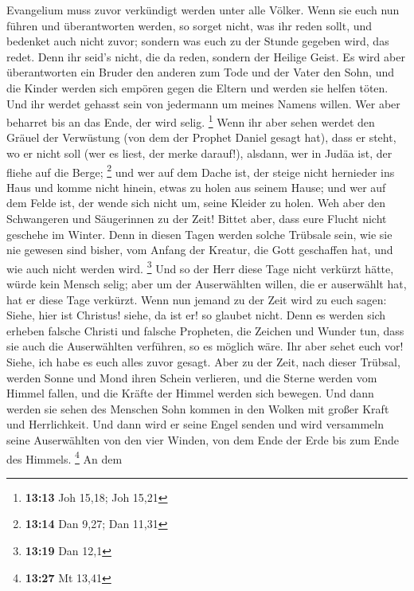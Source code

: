 Evangelium muss zuvor verkündigt werden unter alle Völker. 
Wenn sie euch nun führen und überantworten werden, so sorget nicht, was
ihr reden sollt, und bedenket auch nicht zuvor; sondern was euch zu der
Stunde gegeben wird, das redet. Denn ihr seid's nicht, die da reden,
sondern der Heilige Geist.  Es wird aber überantworten ein
Bruder den anderen zum Tode und der Vater den Sohn, und die Kinder
werden sich empören gegen die Eltern und werden sie helfen töten.
 Und ihr werdet gehasst sein von jedermann um meines Namens
willen. Wer aber beharret bis an das Ende, der wird selig. \footnote{\textbf{13:13}
  Joh 15,18; Joh 15,21}  Wenn ihr aber sehen werdet den
Gräuel der Verwüstung (von dem der Prophet Daniel gesagt hat), dass er
steht, wo er nicht soll (wer es liest, der merke darauf!), alsdann, wer
in Judäa ist, der fliehe auf die Berge; \footnote{\textbf{13:14} Dan
  9,27; Dan 11,31}  und wer auf dem Dache ist, der steige
nicht hernieder ins Haus und komme nicht hinein, etwas zu holen aus
seinem Hause;  und wer auf dem Felde ist, der wende sich
nicht um, seine Kleider zu holen.  Weh aber den Schwangeren
und Säugerinnen zu der Zeit!  Bittet aber, dass eure Flucht
nicht geschehe im Winter.  Denn in diesen Tagen werden
solche Trübsale sein, wie sie nie gewesen sind bisher, vom Anfang der
Kreatur, die Gott geschaffen hat, und wie auch nicht werden wird.
\footnote{\textbf{13:19} Dan 12,1}  Und so der Herr diese
Tage nicht verkürzt hätte, würde kein Mensch selig; aber um der
Auserwählten willen, die er auserwählt hat, hat er diese Tage verkürzt.
 Wenn nun jemand zu der Zeit wird zu euch sagen: Siehe,
hier ist Christus! siehe, da ist er! so glaubet nicht. 
Denn es werden sich erheben falsche Christi und falsche Propheten, die
Zeichen und Wunder tun, dass sie auch die Auserwählten verführen, so es
möglich wäre.  Ihr aber sehet euch vor! Siehe, ich habe es
euch alles zuvor gesagt.  Aber zu der Zeit, nach dieser
Trübsal, werden Sonne und Mond ihren Schein verlieren,  und
die Sterne werden vom Himmel fallen, und die Kräfte der Himmel werden
sich bewegen.  Und dann werden sie sehen des Menschen Sohn
kommen in den Wolken mit großer Kraft und Herrlichkeit. 
Und dann wird er seine Engel senden und wird versammeln seine
Auserwählten von den vier Winden, von dem Ende der Erde bis zum Ende des
Himmels. \footnote{\textbf{13:27} Mt 13,41}  An dem
